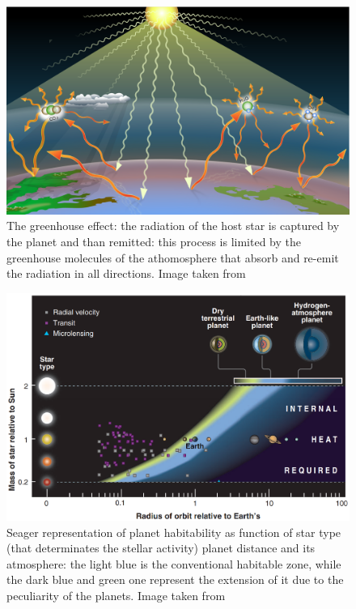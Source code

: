 \documentclass[
12pt, %
a4paper, %
oneside, %
headinclude,footinclude, %
BCOR5mm, %
]{scrartcl}
\begin{document}
\begin{figure}[h]
\begin{center}
\includegraphics[width=1\textwidth]{Pic/Greenhouse-effect-t2.png}
\caption{The greenhouse effect: the radiation of the host star is captured by the planet and than remitted: this process is limited by the greenhouse molecules of the athomosphere that absorb and re-emit the radiation in all directions. Image taken from \cite{Greenhouse-effect-t2}}
\label{Greenhouse-effect-t2}
\end{center}
\end{figure}

\begin{figure}[h]
\begin{center}
\includegraphics[width=1\textwidth]{Pic/Planets_habitability_Seager.png}
\caption{Seager representation of planet habitability as function of star type (that determinates the stellar activity) planet distance and its atmosphere: the light blue is the conventional habitable zone, while the dark blue and green one represent the extension of it due to the peculiarity of the planets. Image taken from \cite{seager2013exoplanet}}
\label{Planets_habitability_Seager}
\end{center}
\end{figure}
\end{document}
